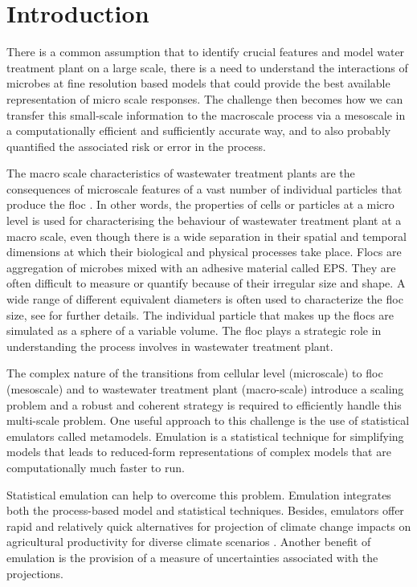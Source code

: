 
\section{Introduction}
There is a common assumption that to identify crucial features and model water treatment plant on a large scale, there is a need to understand the interactions of microbes at fine resolution based models that could provide the best available representation of micro scale responses. The challenge then becomes how we can transfer this small-scale information to the macroscale process via a mesoscale in a computationally efficient and sufficiently accurate way, and to also probably quantified the associated risk or error in the process.

The macro scale characteristics of wastewater treatment plants are the consequences of microscale features of a vast number of individual particles that produce the floc \citep{l11}. In other words, the properties of cells or particles at a micro level is used for characterising the behaviour of wastewater treatment plant at a macro scale, even though there is a wide separation in their spatial and temporal dimensions at which their biological and physical processes take place.  Flocs are aggregation of microbes mixed with an adhesive material called EPS. They are often difficult to measure or quantify because of their irregular size and shape.  A wide range of different equivalent diameters is often used to characterize the floc size, see \citet{l3} for further details. The individual particle that makes up the flocs are simulated as a sphere of a variable volume. The floc plays a strategic role in understanding the process involves in wastewater treatment plant. 

The complex nature of the transitions from cellular level (microscale) to floc (mesoscale) and to wastewater treatment plant (macro-scale) introduce a scaling problem and a robust and coherent strategy is required to efficiently handle this multi-scale problem. One useful approach to this challenge is the use of statistical emulators called metamodels. Emulation is a statistical technique for simplifying models that leads to reduced-form representations of complex models that are computationally much faster to run.

Statistical emulation can help to overcome this problem. Emulation integrates both the process-based model and statistical techniques. Besides, emulators offer rapid and relatively quick alternatives for projection of climate change impacts on agricultural productivity for diverse climate scenarios \citep{qwole}. Another benefit of emulation is the provision of a measure of uncertainties associated with the projections. 

